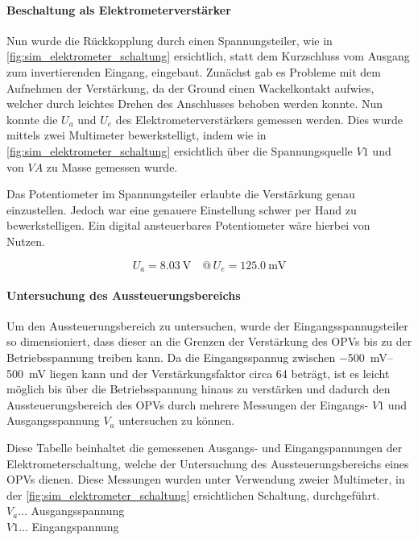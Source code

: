 \documentclass[12pt,english,ngerman]{scrartcl}
\begin{document}
\paragraph{Beschaltung als Elektrometerverstärker}
Nun wurde die Rückkopplung durch einen Spannungsteiler, wie in
\autoref{fig:sim_elektrometer_schaltung} ersichtlich, statt dem Kurzschluss vom
Ausgang zum invertierenden Eingang, eingebaut. Zunächst gab es Probleme mit dem
Aufnehmen der Verstärkung, da der Ground einen Wackelkontakt aufwies,
welcher durch leichtes Drehen des Anschlusses behoben werden konnte.
Nun konnte die $U_a$ und $U_e$ des Elektrometerverstärkers gemessen werden. Dies
wurde mittels zwei Multimeter \cite{fluke175} bewerkstelligt, indem wie in
\autoref{fig:sim_elektrometer_schaltung} ersichtlich über die Spannungsquelle
$V1$ und von $VA$ zu Masse gemessen wurde.

Das Potentiometer im Spannungsteiler erlaubte die Verstärkung genau einzustellen.
Jedoch war eine genauere Einstellung schwer per Hand zu bewerkstelligen. Ein digital
ansteuerbares Potentiometer wäre hierbei von Nutzen.

\begin{equation}
  U_a = \SI{8.03}{\volt} \quad @\, U_e = \SI{125.0}{\milli\volt}
  \label{eq:messwert_elektro_ausgang_eingang}
\end{equation}

\paragraph{Untersuchung des Aussteuerungsbereichs} \label{sec:Versuchohnekond}
Um den Aussteuerungsbereich zu untersuchen, wurde der
Eingangsspannugsteiler so dimensioniert, dass dieser an die Grenzen der
Verstärkung des OPVs bis zu der Betriebsspannung treiben kann. Da die
Eingangsspannug zwischen \SIrange{-500}{500}{\milli\volt} liegen kann und der Verstärkungsfaktor
circa \num{64} beträgt, ist es leicht möglich bis über die Betriebsspannung hinaus zu
verstärken und dadurch den Aussteuerungsbereich des OPVs durch mehrere
Messungen der Eingangs- $V1$ und Ausgangsspannung $V_a$ untersuchen zu können.


\begin{table}[H]
  \caption{Diese Tabelle beinhaltet die gemessenen Ausgangs- und
    Eingangspannungen der Elektrometerschaltung, welche der Untersuchung des
    Aussteuerungsbereichs eines OPVs\cite{uA741} dienen. Diese Messungen wurden
    unter Verwendung zweier Multimeter\cite{fluke175}, in der
    \autoref{fig:sim_elektrometer_schaltung} ersichtlichen Schaltung, durchgeführt.\\
  $V_a \dots$ Ausgangsspannung \\
  $V1 \dots$ Eingangspannung 
  }
  \label{tab:mess_elektro_aussteurerung}
  \centering
  
\end{table}
\end{document}
